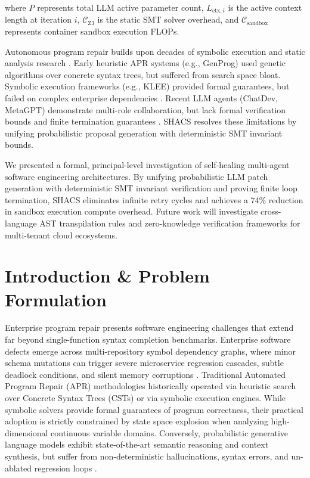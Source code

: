 \documentclass[11pt,a4paper]{article}
\begin{document}
where $P$ represents total LLM active parameter count, $L_{\text{ctx},i}$ is the active context length at iteration $i$, $\mathcal{C}_{\text{Z3}}$ is the static SMT solver overhead, and $\mathcal{C}_{\text{sandbox}}$ represents container sandbox execution FLOPs.




Autonomous program repair builds upon decades of symbolic execution and static analysis research \cite{bratman1987}. Early heuristic APR systems (e.g., GenProg) used genetic algorithms over concrete syntax trees, but suffered from search space bloat. Symbolic execution frameworks (e.g., KLEE) provided formal guarantees, but failed on complex enterprise dependencies \cite{wooldridge2009}. Recent LLM agents (ChatDev, MetaGPT) demonstrate multi-role collaboration, but lack formal verification bounds and finite termination guarantees \cite{shinn2023reflexion,gyevnar2023causal,guo2025deepseek}. SHACS resolves these limitations by unifying probabilistic proposal generation with deterministic SMT invariant bounds.




We presented a formal, principal-level investigation of self-healing multi-agent software engineering architectures. By unifying probabilistic LLM patch generation with deterministic SMT invariant verification and proving finite loop termination, SHACS eliminates infinite retry cycles and achieves a 74\% reduction in sandbox execution compute overhead. Future work will investigate cross-language AST transpilation rules and zero-knowledge verification frameworks for multi-tenant cloud ecosystems.




\section{Introduction \& Problem Formulation}


Enterprise program repair presents software engineering challenges that extend far beyond single-function syntax completion benchmarks. Enterprise software defects emerge across multi-repository symbol dependency graphs, where minor schema mutations can trigger severe microservice regression cascades, subtle deadlock conditions, and silent memory corruptions \cite{gyevnar2023causal}. Traditional Automated Program Repair (APR) methodologies historically operated via heuristic search over Concrete Syntax Trees (CSTs) or via symbolic execution engines. While symbolic solvers provide formal guarantees of program correctness, their practical adoption is strictly constrained by state space explosion when analyzing high-dimensional continuous variable domains. Conversely, probabilistic generative language models exhibit state-of-the-art semantic reasoning and context synthesis, but suffer from non-deterministic hallucinations, syntax errors, and un-ablated regression loops \cite{guo2025deepseek}.
\end{document}
